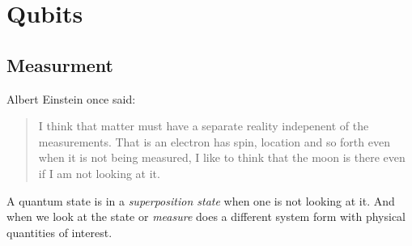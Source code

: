 
\chapter{Qubits}


\section{Measurment}

Albert Einstein once said:
\begin{quote}
I think that matter must have a 
separate reality indepenent of the measurements. 
That is an electron has spin, location and so forth even when 
it is not being measured, I like to think that the moon is there even if 
I am not looking at it.
\end{quote}

A quantum state is in a \textit{superposition state} when 
one is not looking at it. And when we look at the state 
or \textit{measure} does a different system form with 
physical quantities of interest. 
